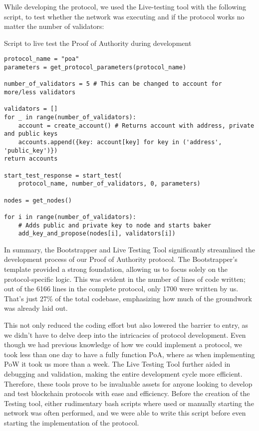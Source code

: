 While developing the protocol, we used the Live-testing tool with the following script, to test whether the network was executing and if the protocol works no matter the number of validators:

\begin{listing}[H]
\caption{Script to live test the Proof of Authority during development}
\label{lst:python_code}
\begin{verbatim}
protocol_name = "poa"
parameters = get_protocol_parameters(protocol_name)

number_of_validators = 5 # This can be changed to account for more/less validators

validators = []
for _ in range(number_of_validators):
    account = create_account() # Returns account with address, private and public keys
    accounts.append({key: account[key] for key in ('address', 'public_key')})
return accounts

start_test_response = start_test(
    protocol_name, number_of_validators, 0, parameters)

nodes = get_nodes() 

for i in range(number_of_validators):
    # Adds public and private key to node and starts baker
    add_key_and_propose(nodes[i], validators[i])
\end{verbatim}
\end{listing}



In summary, the Bootstrapper and Live Testing Tool significantly streamlined the development process of our Proof of Authority protocol. The Bootstrapper's template provided a strong foundation, allowing us to focus solely on the protocol-specific logic. This was evident in the number of lines of code written; out of the 6166 lines in the complete protocol, only 1700 were written by us. That's just 27\% of the total codebase, emphasizing how much of the groundwork was already laid out. 

This not only reduced the coding effort but also lowered the barrier to entry, as we didn't have to delve deep into the intricacies of protocol development. 
Even though we had previous knowledge of how we could implement a protocol, we took less than one day to have a fully function PoA, where as when implementing PoW it took us more than a week.
The Live Testing Tool further aided in debugging and validation, making the entire development cycle more efficient.
Therefore, these tools prove to be invaluable assets for anyone looking to develop and test blockchain protocols with ease and efficiency.
Before the creation of the Testing tool, either rudimentary bash scripts where used or manually starting the network was often performed, and we were able to write this script before even starting the implementation of the protocol.




